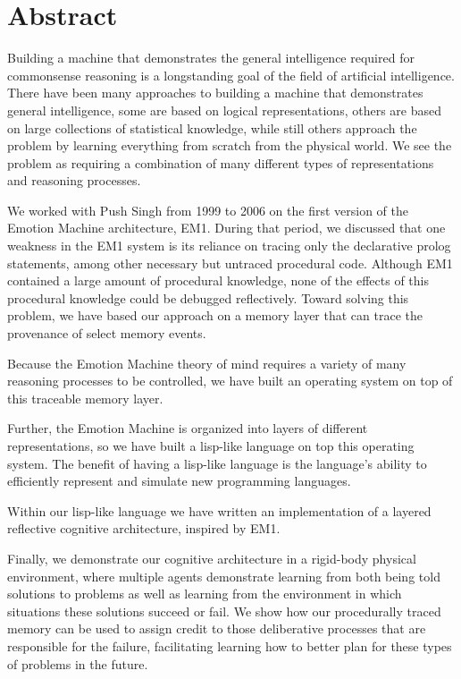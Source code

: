 \begingroup
\let\clearpage\relax
\let\cleardoublepage\relax
\let\cleardoublepage\relax

\chapter*{Abstract}

Building a machine that demonstrates the general intelligence required
for commonsense reasoning is a longstanding goal of the field of
artificial intelligence.  There have been many approaches to building
a machine that demonstrates general intelligence, some are based on
logical representations, others are based on large collections of
statistical knowledge, while still others approach the problem by
learning everything from scratch from the physical world.  We see the
problem as requiring a combination of many different types of
representations and reasoning processes.

We worked with Push Singh from 1999 to 2006 on the first version of
the Emotion Machine architecture, EM1.  During that period, we
discussed that one weakness in the EM1 system is its reliance on
tracing only the declarative prolog statements, among other necessary
but untraced procedural code.  Although EM1 contained a large amount
of procedural knowledge, none of the effects of this procedural
knowledge could be debugged reflectively.  Toward solving this
problem, we have based our approach on a memory layer that can trace
the provenance of select memory events.

Because the Emotion Machine theory of mind requires a variety of many
reasoning processes to be controlled, we have built an operating
system on top of this traceable memory layer.

Further, the Emotion Machine is organized into layers of different
representations, so we have built a lisp-like language on top this
operating system.  The benefit of having a lisp-like language is the
language's ability to efficiently represent and simulate new
programming languages.

Within our lisp-like language we have written an implementation of a
layered reflective cognitive architecture, inspired by EM1.

Finally, we demonstrate our cognitive architecture in a rigid-body
physical environment, where multiple agents demonstrate learning from
both being told solutions to problems as well as learning from the
environment in which situations these solutions succeed or fail.  We
show how our procedurally traced memory can be used to assign credit
to those deliberative processes that are responsible for the failure,
facilitating learning how to better plan for these types of problems
in the future.

